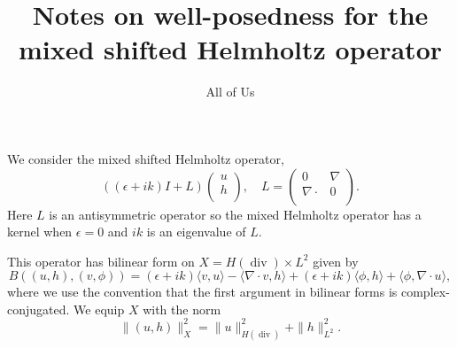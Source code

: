 \documentclass{article}
\DeclareMathOperator{\DIV}{div}
\begin{document}
\title{Notes on well-posedness for the mixed shifted Helmholtz
  operator}
\author{All of Us}
\maketitle

We consider the mixed shifted Helmholtz operator,
\begin{equation}
  \left((\epsilon + ik)I + L\right)
  \begin{pmatrix}
    u\\
    h\\
  \end{pmatrix},
  \quad
  L = \begin{pmatrix}
    0 & \nabla \\
    \nabla\cdot & 0 \\
    \end{pmatrix}.
\end{equation}
Here $L$ is an antisymmetric operator so the mixed Helmholtz operator
has a kernel when $\epsilon=0$ and $ik$ is an eigenvalue of $L$.

This operator has bilinear form on $X=H(\DIV)\times L^2$ given by
\begin{equation}
  B((u,h), (v,\phi)) = (\epsilon + ik)\langle v, u \rangle
  - \langle \nabla\cdot v, h \rangle +
  (\epsilon + ik)\langle \phi, h \rangle + \langle \phi, \nabla\cdot u \rangle, 
\end{equation}
where we use the convention that the first argument in bilinear forms
is complex-conjugated. We equip $X$ with the norm
\begin{equation}
\|(u,h)\|^2_X = \|u\|_{H(\DIV)}^2 + \|h\|^2_{L^2}.
\end{equation}
\end{document}
